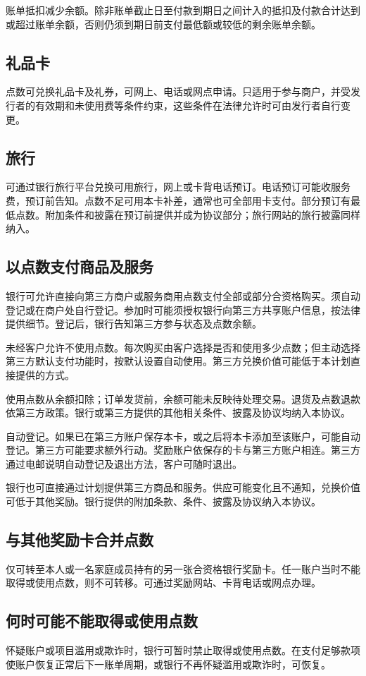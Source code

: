 \documentclass[UTF8,fontset=none,11pt,a4paper]{ctexart}
\begin{document}
账单抵扣减少余额。除非账单截止日至付款到期日之间计入的抵扣及付款合计达到或超过账单余额，否则仍须到期日前支付最低额或较低的剩余账单余额。


\subsection*{礼品卡}
点数可兑换礼品卡及礼券，可网上、电话或网点申请。只适用于参与商户，并受发行者的有效期和未使用费等条件约束，这些条件在法律允许时可由发行者自行变更。


\subsection*{旅行}
可通过银行旅行平台兑换可用旅行，网上或卡背电话预订。电话预订可能收服务费，预订前告知。点数不足可用本卡补差，通常也可全部用卡支付。部分预订有最低点数。附加条件和披露在预订前提供并成为协议部分；旅行网站的旅行披露同样纳入。


\subsection*{以点数支付商品及服务}
银行可允许直接向第三方商户或服务商用点数支付全部或部分合资格购买。须自动登记或在商户处自行登记。参加时可能须授权银行向第三方共享账户信息，按法律提供细节。登记后，银行告知第三方参与状态及点数余额。


未经客户允许不使用点数。每次购买由客户选择是否和使用多少点数；但主动选择第三方默认支付功能时，按默认设置自动使用。第三方兑换价值可能低于本计划直接提供的方式。


使用点数从余额扣除；订单发货前，余额可能未反映待处理交易。退货及点数退款依第三方政策。银行或第三方提供的其他相关条件、披露及协议均纳入本协议。


自动登记。如果已在第三方账户保存本卡，或之后将本卡添加至该账户，可能自动登记。第三方可能要求额外行动。奖励账户依保存的卡与第三方账户相连。第三方通过电邮说明自动登记及退出方法，客户可随时退出。


银行也可直接通过计划提供第三方商品和服务。供应可能变化且不通知，兑换价值可低于其他奖励。银行提供的附加条款、条件、披露及协议纳入本协议。


\subsection*{与其他奖励卡合并点数}
仅可转至本人或一名家庭成员持有的另一张合资格银行奖励卡。任一账户当时不能取得或使用点数，则不可转移。可通过奖励网站、卡背电话或网点办理。


\subsection*{何时可能不能取得或使用点数}
怀疑账户或项目滥用或欺诈时，银行可暂时禁止取得或使用点数。在支付足够款项使账户恢复正常后下一账单周期，或银行不再怀疑滥用或欺诈时，可恢复。
\end{document}

